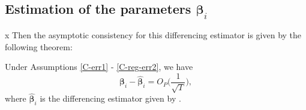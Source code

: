 \documentclass[a4paper,12pt]{article}
\makeatletter
\renewcommand{\eqref}[1]{\tagform@{\ref{#1}}}
\makeatother
\begin{document}

\subsection{Estimation of the parameters $\bm{\beta}_i$}\label{subsec:theo:beta}
x
Then the asymptotic consistency for this differencing estimator is given by the following theorem:

\begin{theorem}\label{theo:beta}
Under Assumptions \ref{C-err1} - \ref{C-reg-err2}, we have
\[\bm{\beta}_i - \widehat{\bm{\beta}}_i  = O_P \Big(\frac{1}{\sqrt{T}}\Big),
\]
where $\widehat{\bm{\beta}}_i$ is the differencing estimator given by \eqref{eq:beta:est}.
\end{theorem}



\end{document}

